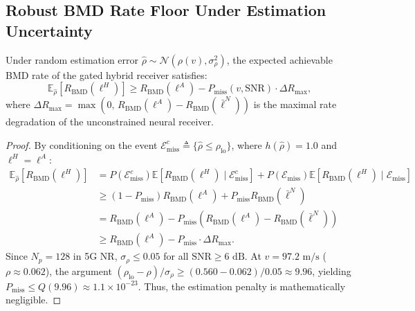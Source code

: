 \subsection{Robust BMD Rate Floor Under Estimation Uncertainty}
\begin{theorem}
Under random estimation error $\hat{\rho} \sim \mathcal{N}(\rho(v), \sigma_{\rho}^2)$, the expected achievable BMD rate of the gated hybrid receiver satisfies:
\begin{equation}
    \mathbb{E}_{\hat{\rho}}\left[ R_{\mathrm{BMD}}(\ell^H) \right] \ge R_{\mathrm{BMD}}(\ell^A) - P_{\mathrm{miss}}(v, \mathrm{SNR}) \cdot \Delta R_{\mathrm{max}},
\end{equation}
where $\Delta R_{\mathrm{max}} = \max\left(0, \, R_{\mathrm{BMD}}(\ell^A) - R_{\mathrm{BMD}}(\bar{\ell}^N)\right)$ is the maximal rate degradation of the unconstrained neural receiver.
\end{theorem}

\begin{proof}
By conditioning on the event $\mathcal{E}_{\mathrm{miss}}^c \triangleq \{\hat{\rho} \le \rho_{\mathrm{lo}}\}$, where $h(\hat{\rho}) = 1.0$ and $\ell^H = \ell^A$:
\begin{align}
    \mathbb{E}_{\hat{\rho}}\left[ R_{\mathrm{BMD}}(\ell^H) \right] &= P(\mathcal{E}_{\mathrm{miss}}^c) \mathbb{E}\left[ R_{\mathrm{BMD}}(\ell^H) \mid \mathcal{E}_{\mathrm{miss}}^c \right] + P(\mathcal{E}_{\mathrm{miss}}) \mathbb{E}\left[ R_{\mathrm{BMD}}(\ell^H) \mid \mathcal{E}_{\mathrm{miss}} \right] \\
    &\ge (1 - P_{\mathrm{miss}}) R_{\mathrm{BMD}}(\ell^A) + P_{\mathrm{miss}} R_{\mathrm{BMD}}(\bar{\ell}^N) \\
    &= R_{\mathrm{BMD}}(\ell^A) - P_{\mathrm{miss}} \left( R_{\mathrm{BMD}}(\ell^A) - R_{\mathrm{BMD}}(\bar{\ell}^N) \right) \\
    &\ge R_{\mathrm{BMD}}(\ell^A) - P_{\mathrm{miss}} \cdot \Delta R_{\mathrm{max}}.
\end{align}
Since $N_p = 128$ in 5G NR, $\sigma_\rho \le 0.05$ for all $\mathrm{SNR} \ge 6\text{ dB}$. At $v = 97.2\text{ m/s}$ ($\rho \approx 0.062$), the argument $(\rho_{\mathrm{lo}} - \rho)/\sigma_\rho \ge (0.560 - 0.062)/0.05 \approx 9.96$, yielding $P_{\mathrm{miss}} \le Q(9.96) \approx 1.1 \times 10^{-23}$. Thus, the estimation penalty is mathematically negligible.
\end{proof}
